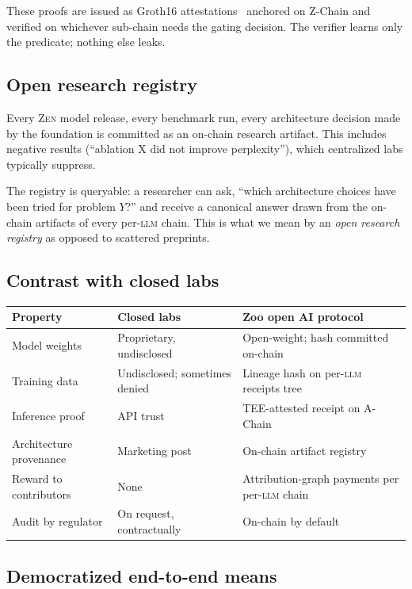 These proofs are issued as Groth16 attestations~\cite{groth16}
anchored on Z-Chain and verified on whichever \Lux{} sub-chain
needs the gating decision. The verifier learns only the predicate;
nothing else leaks.

\subsection{Open research registry}

Every \textsc{Zen} model release, every benchmark run, every
architecture decision made by the foundation is committed as an
on-chain research artifact. This includes negative results
(``ablation X did not improve perplexity''), which centralized labs
typically suppress.

The registry is queryable: a researcher can ask, ``which architecture
choices have been tried for problem $Y$?'' and receive a canonical
answer drawn from the on-chain artifacts of every per-\textsc{llm}
chain. This is what we mean by an \emph{open research registry} as
opposed to scattered preprints.

\subsection{Contrast with closed labs}

\begin{longtable}{p{4.5cm}p{4.7cm}p{5.0cm}}
\toprule
\textbf{Property} & \textbf{Closed labs} & \textbf{Zoo open AI protocol} \\
\midrule
\endhead
Model weights & Proprietary, undisclosed & Open-weight; hash committed
   on-chain \\
Training data & Undisclosed; sometimes denied & Lineage hash on
   per-\textsc{llm} receipts tree \\
Inference proof & API trust & TEE-attested receipt on A-Chain \\
Architecture provenance & Marketing post & On-chain artifact registry \\
Reward to contributors & None & Attribution-graph payments
   per per-\textsc{llm} chain \\
Audit by regulator & On request, contractually & On-chain by default \\
\bottomrule
\end{longtable}

\subsection{Democratized end-to-end means}

